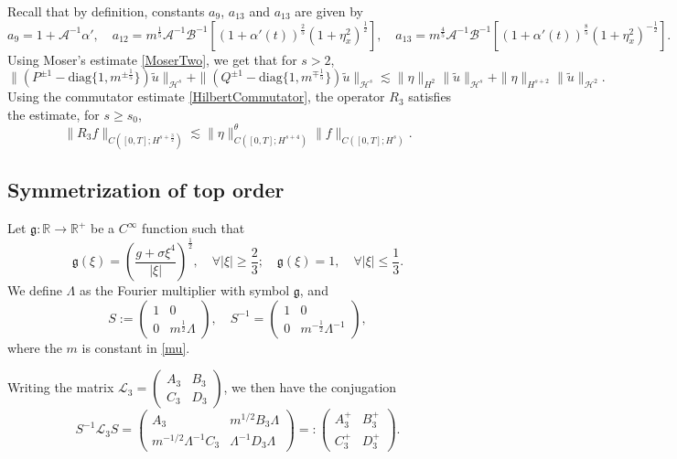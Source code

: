 \documentclass[12pt]{amsart}
\theoremstyle{remark}
\theoremstyle{definition}
\numberwithin{equation}{section}
\newcommand{\R}{\mathbb{R}}
\renewcommand{\H}{{\mathcal H }}
\newcommand{\al}{\alpha}
\newcommand{\f}{\frac}
\newcommand{\mA}{\mathcal{A}}
\newcommand{\mB}{\mathcal{B}}
\newcommand{\mL}{\mathcal{L}}
\newcommand{\inv}{^{-1}}
\begin{document}
Recall that by definition, constants $a_9$, $a_{13}$ and $a_{13}$ are given by
\begin{equation*}
a_9 = 1+\mA^{-1}\al', \quad a_{12} = m^\f15\mA^{-1}\mB\inv[(1+\al'(t))^{\f25}(1+\eta_x^2)^{\f12}], \quad 
a_{13}  = m^\f45\mA^{-1}\mB\inv [(1+\al'(t))^{\f85}(1+\eta_x^2)^{-\f12}].
\end{equation*}
Using Moser's estimate \eqref{MoserTwo}, we get that for $s>2$,
\begin{equation}\label{L2inv}
  \|(P^{\pm1} - \text{diag}\{1, m^{\pm\f15} \}) \tilde{u}\|_{\H^s} +  \|(Q^{\pm 1}- \text{diag}\{1, m^{\mp\f15} \})\tilde{u}\|_{\H^s} \lesssim \|\eta\|_{H^{2}}\|\tilde{u}\|_{\mathcal{H}^s} + \|\eta\|_{H^{s+2}}\|\tilde{u}\|_{\mathcal{H}^2}.
\end{equation}
Using the commutator estimate \eqref{HilbertCommutator}, the operator $R_3$ satisfies the estimate, for $s \geq s_0$,
\begin{equation*}
\|R_3 f \|_{C([0,T];H^{s+\f32})} \lesssim \|\eta\|^\theta_{C([0,T];H^{s+4})} \|f\|_{C([0,T];H^s)}.
\end{equation*}

\subsection{Symmetrization of top order}
Let $\mathfrak{g}: \R \rightarrow \R^+$ be a $C^\infty$ function such that
\begin{equation} \label{LambdaSymbolDef}
\mathfrak{g}(\xi) = \left( \f{g+ \sigma \xi^4}{|\xi|}\right)^\f12, \quad \forall |\xi| \geq \f23; \quad \mathfrak{g}(\xi) = 1, \quad \forall |\xi| \leq \f13.
\end{equation}
We define $\Lambda$ as the Fourier multiplier with symbol $\mathfrak{g}$, and 
\begin{equation} \label{SDef}
 S:=\begin{pmatrix} 
1 & 0 \\ 
0 & m^{\f12}\Lambda
\end{pmatrix},
\quad
S^{-1}=\begin{pmatrix} 
1 & 0 \\ 
0 & m^{-\f12}\Lambda^{-1}
\end{pmatrix},
\end{equation}
where the $m$ is constant in \eqref{mu}.

Writing the matrix $ \mL_3 = \begin{pmatrix} A_3 & B_3 \\ 
C_3 & D_3 \end{pmatrix}$,  we then have the conjugation 
\begin{equation*}
 S\inv \mL_3 S
= \begin{pmatrix} 
A_3 & m^{1/2} B_3 \Lambda
 \\
m^{-1/2} \Lambda^{-1} C_3 & \Lambda^{-1} D_3 \Lambda
\end{pmatrix}
=: \begin{pmatrix} A_3^+ & B_3^+ \\ 
C_3^+ & D_3^+ \end{pmatrix}.
\end{equation*}
\end{document}
